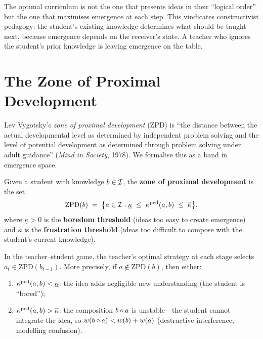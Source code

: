 \begin{interpretation}
The optimal curriculum is not the one that presents ideas in their
``logical order'' but the one that maximises emergence at each step.
This vindicates constructivist pedagogy: the student's existing
knowledge determines what should be taught next, because emergence
depends on the receiver's state.  A teacher who ignores
the student's prior knowledge is leaving emergence on the table.
\end{interpretation}

\section{The Zone of Proximal Development}
\label{sec:zpd}

Lev Vygotsky's \emph{zone of proximal development} (ZPD) is
``the distance between the actual developmental level as
determined by independent problem solving and the level of
potential development as determined through problem solving
under adult guidance'' (\textit{Mind in Society}, 1978).
We formalise this as a band in emergence space.

\begin{definition}
\label{def:zpd}
Given a student with knowledge $b \in \mathcal{I}$, the \textbf{zone of
proximal development} is the set
\[
  \mathrm{ZPD}(b) \;=\; \bigl\{
    a \in \mathcal{I} :
    \underline{\kappa} \;\le\;
    \kappa^{\mathrm{ped}}(a, b) \;\le\;
    \overline{\kappa}
  \bigr\},
\]
where $\underline{\kappa} > 0$ is the \textbf{boredom threshold}
(ideas too easy to create emergence) and $\overline{\kappa}$ is
the \textbf{frustration threshold} (ideas too difficult to compose
with the student's current knowledge).
\end{definition}

\begin{theorem}
\label{thm:zpd-optimal}
In the teacher--student game, the teacher's optimal strategy
at each stage selects $a_t \in \mathrm{ZPD}(b_{t-1})$.
More precisely, if $a \notin \mathrm{ZPD}(b)$, then either:
\begin{enumerate}[label=(\alph*)]
  \item $\kappa^{\mathrm{ped}}(a,b) < \underline{\kappa}$: the idea
    adds negligible new understanding (the student is ``bored'');
  \item $\kappa^{\mathrm{ped}}(a,b) > \overline{\kappa}$: the
    composition $b \circ a$ is unstable---the student cannot
    integrate the idea, so $w(b \circ a) < w(b) + w(a)$
    (destructive interference, modelling confusion).
\end{enumerate}
\end{theorem}

